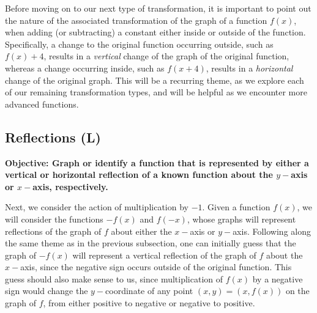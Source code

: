 \documentclass[12pt]{book}
\theoremstyle{definition}
\begin{document}
Before moving on to our next type of transformation, it is important to point out the nature of the associated transformation of the graph of a function $f(x)$, when adding (or subtracting) a constant either inside or outside of the function.  Specifically, a change to the original function occurring outside, such as $f(x)+4$, results in a {\it vertical} change of the graph of the original function, whereas a change occurring inside, such as $f(x+4)$, results in a {\it horizontal} change of the original graph.  This will be a recurring theme, as we explore each of our remaining transformation types, and will be helpful as we encounter more advanced functions.
\subsection{Reflections (L)}
{\bf Objective: Graph or identify a function that is represented by either a vertical or horizontal reflection of a known function about the $y-$axis or $x-$axis, respectively.}\par
Next, we consider the action of multiplication by $-1$.  Given a function $f(x)$, we will consider the functions $-f(x)$ and $f(-x)$, whose graphs will represent reflections of the graph of $f$ about either the $x-$axis or $y-$axis.  Following along the same theme as in the previous subsection, one can initially guess that the graph of $-f(x)$ will represent a vertical reflection of the graph of $f$ about the $x-$axis, since the negative sign occurs outside of the original function.  This guess should also make sense to us, since multiplication of $f(x)$ by a negative sign would change the $y-$coordinate of any point $(x,y)=(x,f(x))$ on the graph of $f$, from either positive to negative or negative to positive.
\newpage
\end{document}

